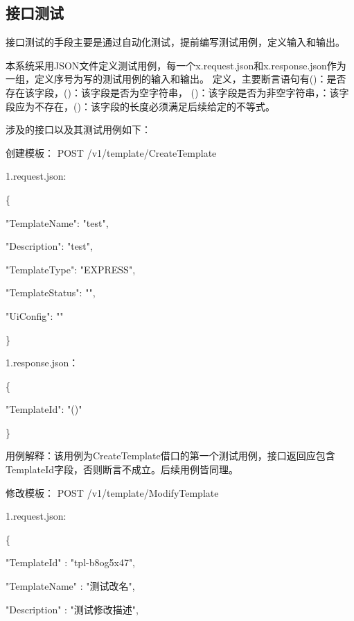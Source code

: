 \subsection{接口测试}
接口测试的手段主要是通过自动化测试，提前编写测试用例，定义输入和输出。

本系统采用JSON文件定义测试用例，每一个x.request.json和x.response.json作为一组，定义序号为写的测试用例的输入和输出。
定义，主要断言语句有\@exists()：是否存在该字段，\@isEmpty()：该字段是否为空字符串，
\@notEmpty()：该字段是否为非空字符串，\@notExists：该字段应为不存在，\@len()：该字段的长度必须满足后续给定的不等式。

涉及的接口以及其测试用例如下：

创建模板：
POST /v1/template/CreateTemplate


1.request.json:

\{

"TemplateName": "test",

"Description": "test",

"TemplateType": "EXPRESS",


"TemplateStatus": "",

"UiConfig": ""

\}

1.response.json：

\{

"TemplateId": "\@exists()"

\}


用例解释：该用例为CreateTemplate借口的第一个测试用例，接口返回应包含TemplateId字段，否则断言不成立。后续用例皆同理。

修改模板：
POST /v1/template/ModifyTemplate

1.request.json:

\{

"TemplateId"          : "tpl-b8og5x47",

"TemplateName"        : "测试改名",

"Description"         : "测试修改描述",


